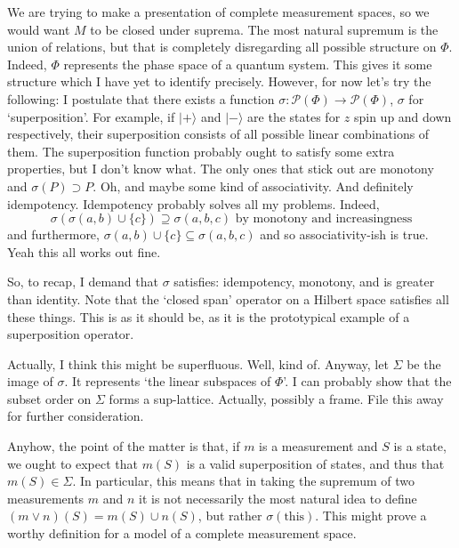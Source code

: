 \documentclass{article}
\theoremstyle{definition}
\newcommand{\ps}{\mathcal{P}}
\begin{document}
We are trying to make a presentation of complete measurement spaces, so we would want $M$ to be closed under suprema. The most natural supremum is the union of relations, but that is completely disregarding all possible structure on $\Phi$. Indeed, $\Phi$ represents the phase space of a quantum system. This gives it some structure which I have yet to identify precisely. However, for now let's try the following: I postulate that there exists a function $\sigma : \ps(\Phi) \to \ps(\Phi)$, $\sigma$ for `superposition'. For example, if $\lvert + \rangle$ and $\lvert - \rangle$ are the states for $z$ spin up and down respectively, their superposition consists of all possible linear combinations of them. The superposition function probably ought to satisfy some extra properties, but I don't know what. The only ones that stick out are monotony and $\sigma(P) \supset P$. Oh, and maybe some kind of associativity. And definitely idempotency. Idempotency probably solves all my problems. Indeed,
\[\sigma(\sigma(a,b) \cup \{c\}) \supseteq \sigma(a,b,c) \text{ by monotony and increasingness}\]
and furthermore, $\sigma(a,b) \cup \{c\} \subseteq \sigma(a,b,c)$ and so associativity-ish is true. Yeah this all works out fine.

So, to recap, I demand that $\sigma$ satisfies: idempotency, monotony, and is greater than identity. Note that the `closed span' operator on a Hilbert space satisfies all these things. This is as it should be, as it is the prototypical example of a superposition operator.

Actually, I think this might be superfluous. Well, kind of. Anyway, let $\Sigma$ be the image of $\sigma$. It represents `the linear subspaces of $\Phi$'. I can probably show that the subset order on $\Sigma$ forms a sup-lattice. Actually, possibly a frame. File this away for further consideration.

Anyhow, the point of the matter is that, if $m$ is a measurement and $S$ is a state, we ought to expect that $m(S)$ is a valid superposition of states, and thus that $m(S) \in \Sigma$. In particular, this means that in taking the supremum of two measurements $m$ and $n$ it is not necessarily the most natural idea to define $(m \vee n)(S) = m(S) \cup n(S)$, but rather $\sigma(\text{this})$. This might prove a worthy definition for a model of a complete measurement space.

{}

\end{document}
